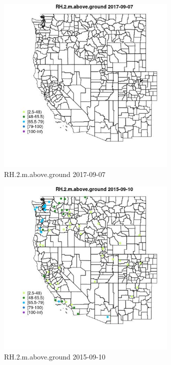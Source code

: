 \begin{figure} 
\centering  
\includegraphics[width=0.77\textwidth]{Code_Outputs/Report_ML_input_PM25_Step4_part_e_de_duplicated_aveswNAs_MapObsRH2maboveground2017-09-07.jpg} 
\caption{\label{fig:Report_ML_input_PM25_Step4_part_e_de_duplicated_aveswNAsMapObsRH2maboveground2017-09-07}RH.2.m.above.ground 2017-09-07} 
\end{figure} 
 

\begin{figure} 
\centering  
\includegraphics[width=0.77\textwidth]{Code_Outputs/Report_ML_input_PM25_Step4_part_e_de_duplicated_aveswNAs_MapObsRH2maboveground2015-09-10.jpg} 
\caption{\label{fig:Report_ML_input_PM25_Step4_part_e_de_duplicated_aveswNAsMapObsRH2maboveground2015-09-10}RH.2.m.above.ground 2015-09-10} 
\end{figure} 
 


